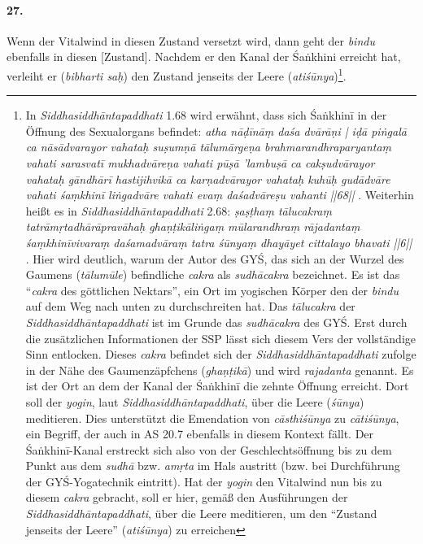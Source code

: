 \documentclass[a4paper,12pt]{article}
\begin{document}
\paragraph{27.} Wenn der Vitalwind in diesen Zustand versetzt wird, dann geht der \textit{bindu} ebenfalls in diesen [Zustand]. Nachdem er den Kanal der Śaṅkhini erreicht hat, verleiht er (\textit{bibharti saḥ}) den Zustand jenseits der Leere (\textit{atiśūnya})\footnote{In \textit{Siddhasiddhāntapaddhati} 1.68 wird erwähnt, dass sich Śaṅkhinī in der Öffnung des Sexualorgans befindet: \textit{atha nāḍīnāṃ daśa dvārāṇi | iḍā piṅgalā ca nāsādvarayor vahataḥ suṣumṇā tālumārgeṇa brahmarandhraparyantaṃ vahati sarasvatī mukhadvāreṇa vahati pūṣā 'lambuṣā ca cakṣudvārayor vahataḥ gāndhārī hastijihvikā ca karṇadvārayor vahataḥ kuhūḥ gudādvāre vahati śaṃkhinī liṅgadvāre vahati evaṃ daśadvāreṣu vahanti ||68||} \parencite[54-55]{ssp}. Weiterhin heißt es in \textit{Siddhasiddhāntapaddhati} 2.68: \textit{ṣaṣṭhaṃ tālucakraṃ tatrāmṛtadhārāpravāhaḥ ghaṇṭikāliṅgaṃ mūlarandhraṃ rājadantaṃ śaṃkhinīvivaraṃ daśamadvāraṃ tatra śūnyaṃ dhayāyet cittalayo bhavati ||6||} \parencite[57]{ssp}. Hier wird deutlich, warum der Autor des GYŚ, das sich an der Wurzel des Gaumens (\textit{tālumūle}) befindliche \textit{cakra} als \textit{sudhācakra} bezeichnet. Es ist das ``\textit{cakra} des göttlichen Nektars'', ein Ort im yogischen Körper den der \textit{bindu} auf dem Weg nach unten zu durchschreiten hat. Das \textit{tālucakra} der \textit{Siddhasiddhāntapaddhati} ist im Grunde das \textit{sudhācakra} des GYŚ. Erst durch die zusätzlichen Informationen der SSP lässt sich diesem Vers der vollständige Sinn entlocken. Dieses \textit{cakra} befindet sich der \textit{Siddhasiddhāntapaddhati} zufolge in der Nähe des Gaumenzäpfchens (\textit{ghaṇṭikā}) und wird \textit{rajadanta} genannt. Es ist der Ort an dem der Kanal der Śaṅkhinī die zehnte Öffnung erreicht. Dort soll der \textit{yogin}, laut \textit{Siddhasiddhāntapaddhati}, über die Leere (\textit{śūnya}) meditieren. Dies unterstützt die Emendation von \textit{cāsthiśūnya} zu \textit{cātiśūnya}, ein Begriff, der auch in AS 20.7 ebenfalls in diesem Kontext fällt. Der Śaṅkhinī-Kanal erstreckt sich also von der Geschlechtsöffnung bis zu dem Punkt aus dem \textit{sudhā} bzw. \textit{amṛta} im Hals austritt (bzw. bei Durchführung der GYŚ-Yogatechnik eintritt). Hat der \textit{yogin} den Vitalwind nun bis zu diesem \textit{cakra} gebracht, soll er hier, gemäß den Ausführungen der \textit{Siddhasiddhāntapaddhati}, über die Leere meditieren, um den ``Zustand jenseits der Leere'' (\textit{atiśūnya}) zu erreichen}.      
\end{document}
